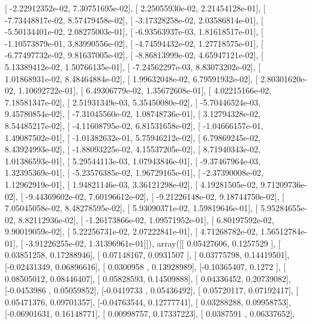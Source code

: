 \documentclass{article}
\begin{document}
       [ -2.22912352e-02,   7.30751695e-02],
       [  2.25055930e-02,   2.21454128e-01],
       [ -7.73448817e-02,   8.57479458e-02],
       [ -3.17328258e-02,   2.03586814e-01],
       [ -5.50134401e-02,   2.08275003e-01],
       [ -6.93563937e-03,   1.81618517e-01],
       [ -1.10573879e-01,   3.83990556e-02],
       [ -4.74594432e-02,   1.27718575e-01],
       [ -6.77497732e-02,   9.81637005e-02],
       [ -8.86813999e-02,   4.65947121e-02],
       [  5.13389412e-02,   1.50766135e-01],
       [ -7.24562297e-03,   8.83073202e-02],
       [  1.01868931e-02,   8.48464884e-02],
       [  1.99632048e-02,   6.79591932e-02],
       [  2.80301620e-02,   1.10692722e-01],
       [  6.49306779e-02,   1.35672608e-01],
       [  4.02215166e-02,   7.18581347e-02],
       [  2.51931349e-03,   5.35450080e-02],
       [ -5.70446524e-03,   9.45780854e-02],
       [ -7.31045560e-02,   1.08748736e-01],
       [  3.12794328e-02,   8.54485217e-02],
       [ -4.11608795e-02,   6.81531658e-02],
       [ -1.04666157e-01,   1.49087502e-01],
       [ -1.01382632e-01,   5.75946212e-02],
       [  6.79869245e-02,   8.43924993e-02],
       [ -1.88093225e-02,   4.15537205e-02],
       [  8.71940343e-02,   1.01386593e-01],
       [  5.29544113e-03,   1.07943846e-01],
       [ -9.37467964e-03,   1.32395369e-01],
       [ -5.23576385e-02,   1.96729165e-01],
       [ -2.37390008e-02,   1.12962919e-01],
       [  1.94821146e-03,   3.36121298e-02],
       [  4.19281505e-02,   9.71209736e-02],
       [ -9.44369602e-02,   7.60196612e-02],
       [ -9.21226148e-02,   9.18744750e-02],
       [  7.05045058e-02,   8.48278595e-02],
       [  5.93090371e-02,   1.59819646e-01],
       [  5.95284655e-02,   8.82112936e-02],
       [ -1.26173866e-02,   1.09571952e-01],
       [  6.80197592e-02,   9.90019059e-02],
       [  5.22256731e-02,   2.07222841e-01],
       [  4.71268782e-02,   1.56512784e-01],
       [ -3.91226255e-02,   1.31396961e-01]]), array([[ 0.05427606,  0.1257529 ],
       [ 0.03851258,  0.17288946],
       [ 0.07148167,  0.0931507 ],
       [ 0.03775798,  0.14419501],
       [-0.02431349,  0.06896616],
       [ 0.0300958 ,  0.13928989],
       [-0.10365407,  0.1272    ],
       [ 0.08505012,  0.08446407],
       [ 0.05828593,  0.14509888],
       [ 0.04336452,  0.20739082],
       [-0.0453986 ,  0.05059852],
       [-0.0419733 ,  0.05436492],
       [ 0.05720117,  0.07192417],
       [ 0.05471376,  0.09701357],
       [-0.04763544,  0.12777741],
       [ 0.03288288,  0.09958753],
       [-0.06901631,  0.16148771],
       [ 0.00998757,  0.17337223],
       [ 0.0387591 ,  0.06337652],
\end{document}

